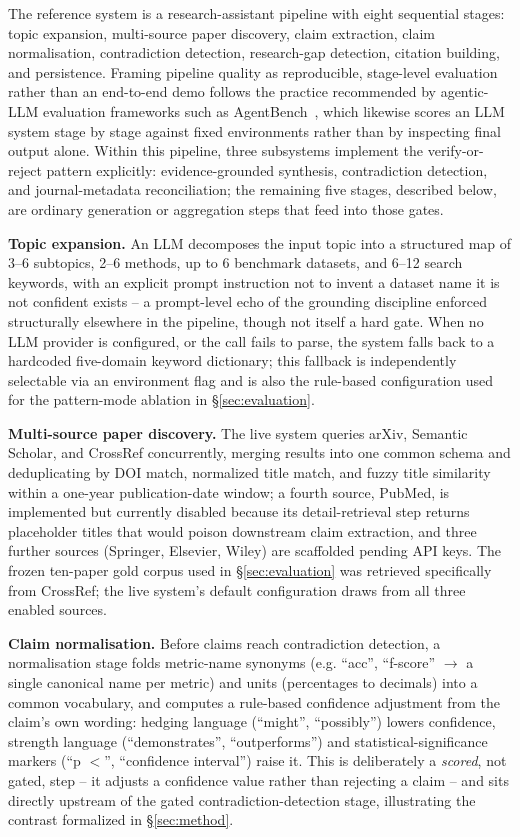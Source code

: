 \documentclass[11pt]{article}
\begin{document}
The reference system is a research-assistant pipeline with eight sequential stages: topic expansion, multi-source paper discovery, claim extraction, claim normalisation, contradiction detection, research-gap detection, citation building, and persistence. Framing pipeline quality as reproducible, stage-level evaluation rather than an end-to-end demo follows the practice recommended by agentic-LLM evaluation frameworks such as AgentBench~\cite{liu2024agentbench}, which likewise scores an LLM system stage by stage against fixed environments rather than by inspecting final output alone. Within this pipeline, three subsystems implement the verify-or-reject pattern explicitly: evidence-grounded synthesis, contradiction detection, and journal-metadata reconciliation; the remaining five stages, described below, are ordinary generation or aggregation steps that feed into those gates.

\textbf{Topic expansion.} An LLM decomposes the input topic into a structured map of 3--6 subtopics, 2--6 methods, up to 6 benchmark datasets, and 6--12 search keywords, with an explicit prompt instruction not to invent a dataset name it is not confident exists -- a prompt-level echo of the grounding discipline enforced structurally elsewhere in the pipeline, though not itself a hard gate. When no LLM provider is configured, or the call fails to parse, the system falls back to a hardcoded five-domain keyword dictionary; this fallback is independently selectable via an environment flag and is also the rule-based configuration used for the pattern-mode ablation in \S\ref{sec:evaluation}.

\textbf{Multi-source paper discovery.} The live system queries arXiv, Semantic Scholar, and CrossRef concurrently, merging results into one common schema and deduplicating by DOI match, normalized title match, and fuzzy title similarity within a one-year publication-date window; a fourth source, PubMed, is implemented but currently disabled because its detail-retrieval step returns placeholder titles that would poison downstream claim extraction, and three further sources (Springer, Elsevier, Wiley) are scaffolded pending API keys. The frozen ten-paper gold corpus used in \S\ref{sec:evaluation} was retrieved specifically from CrossRef; the live system's default configuration draws from all three enabled sources.

\textbf{Claim normalisation.} Before claims reach contradiction detection, a normalisation stage folds metric-name synonyms (e.g. ``acc'', ``f-score'' $\to$ a single canonical name per metric) and units (percentages to decimals) into a common vocabulary, and computes a rule-based confidence adjustment from the claim's own wording: hedging language (``might'', ``possibly'') lowers confidence, strength language (``demonstrates'', ``outperforms'') and statistical-significance markers (``p $<$'', ``confidence interval'') raise it. This is deliberately a \emph{scored}, not gated, step -- it adjusts a confidence value rather than rejecting a claim -- and sits directly upstream of the gated contradiction-detection stage, illustrating the contrast formalized in \S\ref{sec:method}.
\end{document}
